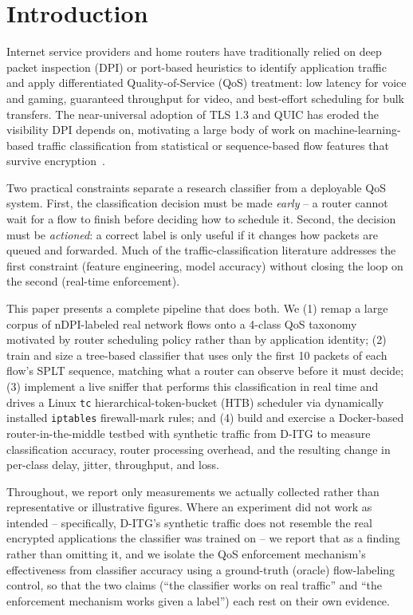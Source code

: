 \documentclass[10pt,twocolumn]{article}
\begin{document}
\section{Introduction}

Internet service providers and home routers have traditionally relied on
deep packet inspection (DPI) or port-based heuristics to identify
application traffic and apply differentiated Quality-of-Service (QoS)
treatment: low latency for voice and gaming, guaranteed throughput for
video, and best-effort scheduling for bulk transfers. The near-universal
adoption of TLS 1.3 and QUIC has eroded the visibility DPI depends on,
motivating a large body of work on machine-learning-based traffic
classification from statistical or sequence-based flow features that
survive encryption~\cite{anderson2017deciphering}.

Two practical constraints separate a research classifier from a
deployable QoS system. First, the classification decision must be made
\emph{early} -- a router cannot wait for a flow to finish before deciding
how to schedule it. Second, the decision must be \emph{actioned}: a
correct label is only useful if it changes how packets are queued and
forwarded. Much of the traffic-classification literature addresses the
first constraint (feature engineering, model accuracy) without closing
the loop on the second (real-time enforcement).

This paper presents a complete pipeline that does both. We (1) remap a
large corpus of nDPI-labeled real network flows onto a 4-class QoS
taxonomy motivated by router scheduling policy rather than by application
identity; (2) train and size a tree-based classifier that uses only the
first 10 packets of each flow's SPLT sequence, matching what a router can
observe before it must decide; (3) implement a live sniffer that performs
this classification in real time and drives a Linux \texttt{tc}
hierarchical-token-bucket (HTB) scheduler via dynamically installed
\texttt{iptables} firewall-mark rules; and (4) build and exercise a
Docker-based router-in-the-middle testbed with synthetic traffic from
D-ITG to measure classification accuracy, router processing overhead, and
the resulting change in per-class delay, jitter, throughput, and loss.

Throughout, we report only measurements we actually collected rather than
representative or illustrative figures. Where an experiment did not work
as intended -- specifically, D-ITG's synthetic traffic does not resemble
the real encrypted applications the classifier was trained on -- we report
that as a finding rather than omitting it, and we isolate the QoS
enforcement mechanism's effectiveness from classifier accuracy using a
ground-truth (oracle) flow-labeling control, so that the two claims
(``the classifier works on real traffic'' and ``the enforcement mechanism
works given a label'') each rest on their own evidence.
\end{document}
